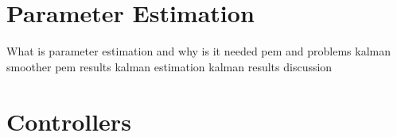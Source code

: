 \documentclass[11pt,aspectratio=169]{beamer}
\begin{document}
\section{Parameter Estimation}
\begin{frame}
What is parameter estimation and why is it needed
pem and problems
kalman smoother
pem results
kalman estimation
kalman results
discussion
\end{frame}


\section{Controllers}
\end{document}
